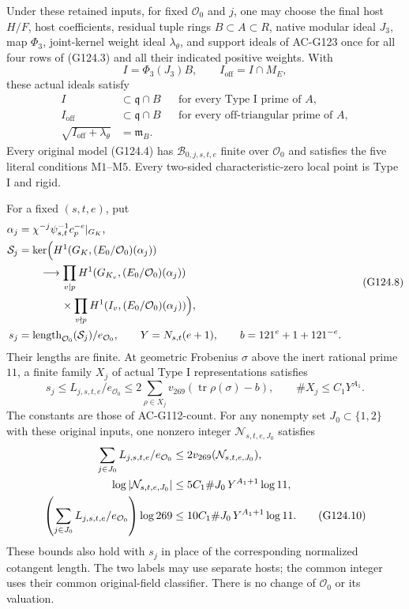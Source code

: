 \begin{theorem}
\label{AC-G124-family-transfer}
Under these retained inputs, for fixed \(\mathcal O_0\) and \(j\),
one may choose the final host \(H/F\), host coefficients, residual
tuple rings \(B\subset A\subset R\), native modular ideal \(J_3\),
map \(\Phi_3\), joint-kernel weight ideal \(\lambda_\theta\), and
support ideals of AC-G123 once for all four rows of (G124.3) and all
their indicated positive weights.  With
\[
 I=\Phi_3(J_3)B,\qquad I_{\mathrm{off}}=I\cap M_E,
 \tag{G124.6}
\]
these actual ideals satisfy
\[
 \begin{aligned}
 I&\subset\mathfrak q\cap B
       &&\text{for every Type I prime of }A,\\
 I_{\mathrm{off}}&\subset\mathfrak q\cap B
       &&\text{for every off-triangular prime of }A,\\
 \sqrt{I_{\mathrm{off}}+\lambda_\theta}&=\mathfrak m_B.
 \end{aligned}
 \tag{G124.7}
\]
Every original model (G124.4) has \(\mathscr B_{0,j,s,t,e}\) finite
over \(\mathcal O_0\) and satisfies the five literal conditions
\(\mathrm{M1}\)--\(\mathrm{M5}\).  Every two-sided
characteristic-zero local point is Type I and rigid.

For a fixed \((s,t,e)\), put
\[
 \begin{split}
 \alpha_j&=\chi^{-j}\psi_{s,t}^{-1}c_p^{-e}|_{G_K},\\
 \mathcal S_j&=\ker\Bigl(
 H^1(G_K,(E_0/\mathcal O_0)(\alpha_j))\\
 &\qquad\longrightarrow
 \prod_{v\mid p}H^1(G_{K_v},(E_0/\mathcal O_0)(\alpha_j))\\
 &\qquad\qquad\times\prod_{v\nmid p}H^1(I_v,(E_0/\mathcal O_0)(\alpha_j))
 \Bigr),\\
 s_j&=\operatorname{length}_{\mathcal O_0}(\mathcal S_j)/e_{\mathcal O_0},
 \qquad Y=N_{s,t}(e+1),\qquad b=121^e+1+121^{-e}.
 \end{split}
 \tag{G124.8}
\]
Their lengths are finite.  At geometric Frobenius \(\sigma\) above
the inert rational prime \(11\), a finite family \(X_j\) of actual
Type I representations satisfies
\[
 s_j\le L_{j,s,t,e}/e_{\mathcal O_0}
 \le 2\sum_{\rho\in X_j}
           v_{269}(\operatorname{tr}\rho(\sigma)-b),
 \qquad \#X_j\le C_1Y^{A_1}.
 \tag{G124.9}
\]
The constants are those of AC-G112-count.  For any nonempty set
\(J_0\subset\{1,2\}\) with these original inputs, one nonzero
integer \(\mathcal N_{s,t,e,J_0}\) satisfies
\begin{align}
 \sum_{j\in J_0}L_{j,s,t,e}/e_{\mathcal O_0}
       &\le2v_{269}(\mathcal N_{s,t,e,J_0}),\notag\\
 \log|\mathcal N_{s,t,e,J_0}|
       &\le5C_1\#J_0\,Y^{A_1+1}\log11,\notag\\
 \left(\sum_{j\in J_0}L_{j,s,t,e}/e_{\mathcal O_0}\right)\log269
       &\le10C_1\#J_0\,Y^{A_1+1}\log11.
 \tag{G124.10}
\end{align}
These bounds also hold with \(s_j\) in place of the corresponding
normalized cotangent length.  The two labels may use separate hosts;
the common integer uses their common original-field classifier.
There is no change of \(\mathcal O_0\) or its valuation.
\end{theorem}

